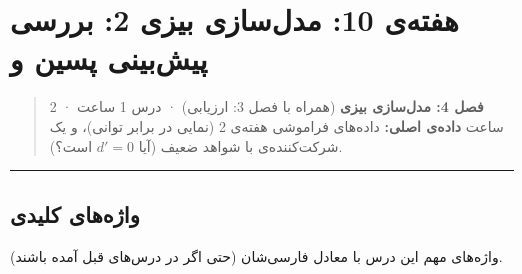 \section{\texorpdfstring{هفته‌ی 10: مدل‌سازی بیزی 2: بررسی پیش‌بینی پسین و
}{هفته‌ی 10: مدل‌سازی بیزی 2: بررسی پیش‌بینی پسین و Bayes factor}}

\begin{quote}
\textbf{فصل 4: مدل‌سازی بیزی} (همراه با فصل 3: ارزیابی) · درس 1 ساعت ·
 2 ساعت \textbf{داده‌ی اصلی:} داده‌های فراموشی هفته‌ی 2 (نمایی در
برابر توانی)، و یک شرکت‌کننده‌ی  با شواهد ضعیف (آیا \(d' = 0\)
است؟).
\end{quote}

\begin{center}\rule{0.5\linewidth}{0.5pt}\end{center}

\subsection{واژه‌های کلیدی}

واژه‌های مهم این درس با معادل فارسی‌شان (حتی اگر در درس‌های قبل آمده
باشند).

